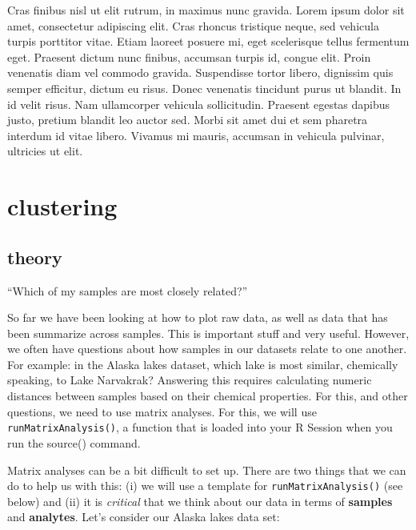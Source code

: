 \documentclass[
]{krantz}
\begin{document}
Cras finibus nisl ut elit rutrum, in maximus nunc gravida. Lorem ipsum dolor sit amet, consectetur adipiscing elit. Cras rhoncus tristique neque, sed vehicula turpis porttitor vitae. Etiam laoreet posuere mi, eget scelerisque tellus fermentum eget. Praesent dictum nunc finibus, accumsan turpis id, congue elit. Proin venenatis diam vel commodo gravida. Suspendisse tortor libero, dignissim quis semper efficitur, dictum eu risus. Donec venenatis tincidunt purus ut blandit. In id velit risus. Nam ullamcorper vehicula sollicitudin. Praesent egestas dapibus justo, pretium blandit leo auctor sed. Morbi sit amet dui et sem pharetra interdum id vitae libero. Vivamus mi mauris, accumsan in vehicula pulvinar, ultricies ut elit.

\hypertarget{clustering}{%
\section{clustering}\label{clustering}}

\hypertarget{theory}{%
\subsection{theory}\label{theory}}

``Which of my samples are most closely related?''

So far we have been looking at how to plot raw data, as well as data that has been summarize across samples. This is important stuff and very useful. However, we often have questions about how samples in our datasets relate to one another. For example: in the Alaska lakes dataset, which lake is most similar, chemically speaking, to Lake Narvakrak? Answering this requires calculating numeric distances between samples based on their chemical properties. For this, and other questions, we need to use matrix analyses. For this, we will use \texttt{runMatrixAnalysis()}, a function that is loaded into your R Session when you run the source() command.

Matrix analyses can be a bit difficult to set up. There are two things that we can do to help us with this: (i) we will use a template for \texttt{runMatrixAnalysis()} (see below) and (ii) it is \emph{critical} that we think about our data in terms of \textbf{samples} and \textbf{analytes}. Let's consider our Alaska lakes data set:
\end{document}
